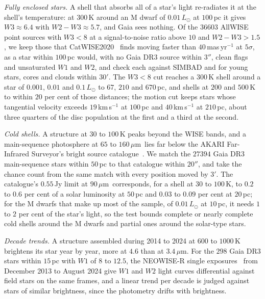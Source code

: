 \documentclass[3p,11pt]{elsarticle}
\newcommand{\um}{\,$\mu$m}
\begin{document}
\emph{Fully enclosed stars.} A shell that absorbs all of a star's light re-radiates it
at the shell's temperature: at $300$\,K around an M dwarf of $0.01\,L_\odot$ at $100$\,pc
it gives $W3\approx6.4$ with $W2-W3\approx5.7$, and Gaia sees nothing. Of the $36603$
AllWISE point sources with $W3<8$ at a signal-to-noise ratio above $10$ and
$W2-W3>1.5$, we keep those that CatWISE2020~\cite{Marocco2021} finds moving faster than
$40$\,mas\,yr$^{-1}$ at $5\sigma$, as a star within $100$\,pc would, with no Gaia DR3
source within $3''$, clean flags and unsaturated $W1$ and $W2$, and check each against
SIMBAD and for young stars, cores and clouds within $30'$. The $W3<8$ cut reaches a
$300$\,K shell around a star of $0.001$, $0.01$ and $0.1\,L_\odot$ to $67$, $210$ and
$670$\,pc, and shells at $200$ and $500$\,K to within $20$ per cent of those distances;
the motion cut keeps stars whose tangential velocity exceeds $19$\,km\,s$^{-1}$ at
$100$\,pc and $40$\,km\,s$^{-1}$ at $210$\,pc, about three quarters of the disc
population at the first and a third at the second.

\emph{Cold shells.} A structure at $30$ to $100$\,K peaks beyond the WISE bands, and a
main-sequence photosphere at $65$ to $160$\um\ lies far below the AKARI Far-Infrared
Surveyor's bright source catalogue~\cite{Murakami2007}. We match the $27394$ Gaia DR3
main-sequence stars within $50$\,pc to that catalogue within $20''$, and take the chance
count from the same match with every position moved by $3'$. The catalogue's $0.55$\,Jy
limit at $90$\um\ corresponds, for a shell at $30$ to $100$\,K, to $0.2$ to $0.6$ per
cent of a solar luminosity at $50$\,pc and $0.03$ to $0.09$ per cent at $20$\,pc; for
the M dwarfs that make up most of the sample, of $0.01\,L_\odot$ at $10$\,pc, it needs
$1$ to $2$ per cent of the star's light, so the test bounds complete or nearly complete
cold shells around the M dwarfs and partial ones around the solar-type stars.

\emph{Decade trends.} A structure assembled during 2014 to 2024 at $600$ to $1000$\,K
brightens its star year by year, more at $4.6$ than at $3.4$\um. For the $298$ Gaia DR3
stars within $15$\,pc with $W1$ of $8$ to $12.5$, the NEOWISE-R single
exposures~\cite{Mainzer2014} from December 2013 to August 2024 give $W1$ and $W2$ light
curves differential against field stars on the same frames, and a linear trend per
decade is judged against stars of similar brightness, since the photometry drifts with
brightness.
\end{document}

